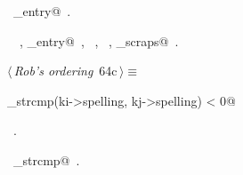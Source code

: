 \documentclass[a4paper]{report}
\begin{document}
\begin{flushleft}
\begin{minipage}{\linewidth}
\begin{list}{}{\setlength{\itemsep}{-\parsep}\setlength{\itemindent}{-\leftmargin}}
\item \NWtxtIdentsDefed\nobreak\  \verb@format_entry@\nobreak\ .\item \NWtxtIdentsUsed\nobreak\  \verb@FILE@\nobreak\ , \verb@load_entry@\nobreak\ , \verb@malloc@\nobreak\ , \verb@Name@\nobreak\ , \verb@num_scraps@\nobreak\ .
\item{}
\end{list}
\end{minipage}\vspace{4ex}
\end{flushleft}
\begin{flushleft} \small
\begin{minipage}{\linewidth}\label{scrap126}\raggedright\small
{} $\langle\,${\it Rob's ordering}\nobreak\ {\footnotesize {64c}}$\,\rangle\equiv$
\vspace{-1ex}
\begin{list}{}{} \item
\mbox{}\verb@robs_strcmp(ki->spelling, kj->spelling) < 0@{\NWsep}
\end{list}
\vspace{-1.5ex}
\footnotesize
\begin{list}{}{\setlength{\itemsep}{-\parsep}\setlength{\itemindent}{-\leftmargin}}
\item \NWtxtMacroRefIn\ .
\item \NWtxtIdentsUsed\nobreak\  \verb@robs_strcmp@\nobreak\ .
\item{}
\end{list}
\end{minipage}\vspace{4ex}
\end{flushleft}
\end{document}
